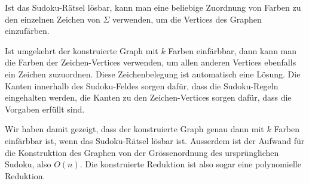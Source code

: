 \begin{loesung}
Ist das Sudoku-Rätsel lösbar, kann man eine beliebige
Zuordnung von Farben zu den einzelnen Zeichen von $\Sigma$ verwenden,
um die Vertices des Graphen einzufärben. 

Ist umgekehrt der konstruierte Graph mit $k$ Farben einfärbbar, dann kann man
die Farben der Zeichen-Vertices verwenden, um allen anderen Vertices
ebenfalls ein Zeichen zuzuordnen. Diese Zeichenbelegung ist automatisch
eine Lösung. Die Kanten innerhalb des Sudoku-Feldes sorgen dafür, dass
die Sudoku-Regeln eingehalten werden, die Kanten zu den Zeichen-Vertices
sorgen dafür, dass die Vorgaben erfüllt sind.

Wir haben damit gezeigt, dass der konstruierte Graph genau dann mit
$k$ Farben einfärbbar ist, wenn das Sudoku-Rätsel lösbar ist. 
Ausserdem ist der Aufwand für die Konstruktion des Graphen von der
Grössenordnung des ursprünglichen Sudoku, also $O(n)$. Die konstruierte
Reduktion ist also sogar eine polynomielle Reduktion.
\end{loesung}


